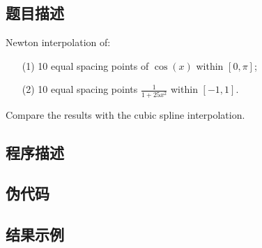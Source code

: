 \subsection{题目描述}
\noindent Newton interpolation of:
\begin{itemize}
    \item[(1)] 10 equal spacing points of \( \cos(x) \) within \( [0, \pi] \);
    \item[(2)] 10 equal spacing points \( \frac{1}{1 + 25x^2} \) within \([-1, 1]\).
\end{itemize}
Compare the results with the cubic spline interpolation.



\subsection{程序描述}


\subsection{伪代码}



\subsection{结果示例}


